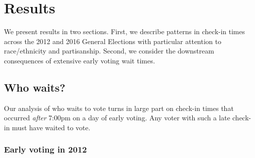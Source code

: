 \documentclass[12pt,titlepage]{article}
\begin{document}

\section*{Results}

We present results in two sections.  First, we describe patterns in
check-in times across the 2012 and 2016 General Elections with
particular attention to race/ethnicity and partisanship.  Second, we
consider the downstream consequences of extensive early voting wait
times.


\subsection*{Who waits?}

Our analysis of who waits to vote turns in large part on check-in
times that occurred \emph{after} 7:00pm on a day of early voting.  Any
voter with such a late check-in must have waited to vote.

\subsubsection*{Early voting in 2012}



\end{document}
